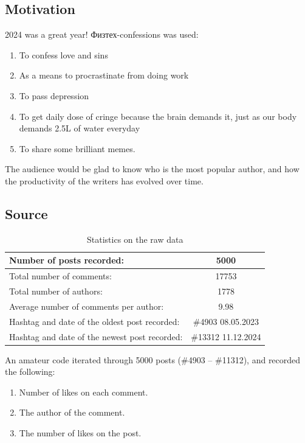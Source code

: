 \documentclass[
	12pt
] {article}
\begin{document}
\subsection{Motivation}
	2024 was a great year! Физтех-confessions was used:
	\begin{enumerate}
		\item To confess love and sins
		\item As a means to procrastinate from doing work
		\item To pass depression
		\item To get daily dose of cringe because the brain demands it, just as our body demands \num{2.5}L of water everyday
		\item To share some brilliant memes.
	\end{enumerate}
	
	The audience would be glad to know who is the most popular author, and how the productivity of the writers has evolved over time.

\subsection{Source}
	\begin{table}[H]
		\centering
		\caption{Statistics on the raw data}
		\label{table:basic-stats-number-likes-comments-author}
		\begin{tabular}{| p{6cm}  c |}
			\hline
			Number of posts recorded: & \num{5000} \\
			\hline
			Total number of comments: & \num{17753} \\
			Total number of authors: & \num{1778} \\
			\hline
			Average number of comments per author: & \num{9.98} \\
			\hline
			Hashtag and date of the oldest post recorded: & \#4903 08.05.2023 \\
			Hashtag and date of the newest post recorded: & \#13312 11.12.2024 \\
			\hline
		\end{tabular}
	\end{table}
	
	An amateur code \cite{code-scrape-py} iterated through 5000 posts (\#4903 -- \#11312), and recorded the following:
	\begin{enumerate}
		\item Number of likes on each comment.
		\item The author of the comment.
		\item The number of likes on the post.
	\end{enumerate}
	
\end{document}
